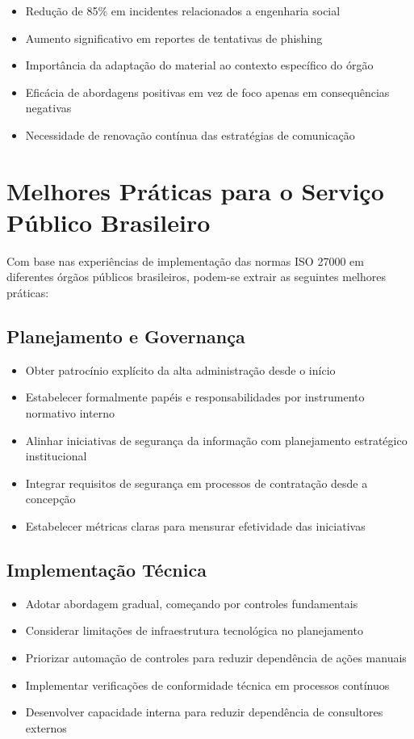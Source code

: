 \documentclass[12pt,a4paper]{report}
\begin{document}
\begin{itemize}
  \item Redução de 85\% em incidentes relacionados a engenharia social
  \item Aumento significativo em reportes de tentativas de phishing
  \item Importância da adaptação do material ao contexto específico do órgão
  \item Eficácia de abordagens positivas em vez de foco apenas em consequências negativas
  \item Necessidade de renovação contínua das estratégias de comunicação
\end{itemize}

\section{Melhores Práticas para o Serviço Público Brasileiro}

Com base nas experiências de implementação das normas ISO 27000 em diferentes órgãos públicos brasileiros, podem-se extrair as seguintes melhores práticas:

\subsection{Planejamento e Governança}

\begin{itemize}
  \item Obter patrocínio explícito da alta administração desde o início
  \item Estabelecer formalmente papéis e responsabilidades por instrumento normativo interno
  \item Alinhar iniciativas de segurança da informação com planejamento estratégico institucional
  \item Integrar requisitos de segurança em processos de contratação desde a concepção
  \item Estabelecer métricas claras para mensurar efetividade das iniciativas
\end{itemize}

\subsection{Implementação Técnica}

\begin{itemize}
  \item Adotar abordagem gradual, começando por controles fundamentais
  \item Considerar limitações de infraestrutura tecnológica no planejamento
  \item Priorizar automação de controles para reduzir dependência de ações manuais
  \item Implementar verificações de conformidade técnica em processos contínuos
  \item Desenvolver capacidade interna para reduzir dependência de consultores externos
\end{itemize}
\end{document}
